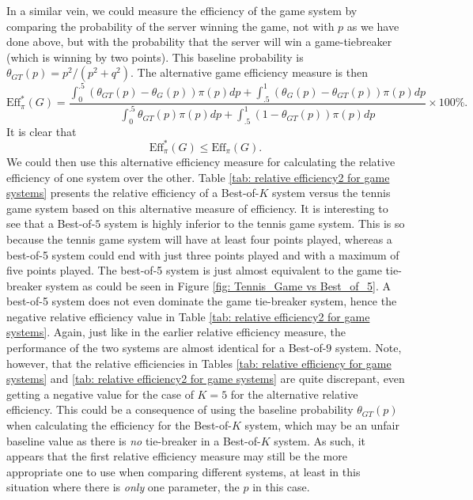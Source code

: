 \documentclass[11pt]{article}
\theoremstyle{plain}
\theoremstyle{definition}
\newcommand{\RED}[1]{{\color{red} #1}}
\begin{document}
{In a similar vein, we could measure the efficiency of the game system by comparing the probability of the server winning the game, not with $p$ as we have done above, but with the probability that the server will win a game-tiebreaker (which is winning by two points). This baseline probability is $\theta_{GT}(p) = p^2/(p^2 + q^2)$. The alternative game efficiency measure is then
%
$$\mbox{Eff}_\pi^*(G) = \frac{\int_0^{.5} (\theta_{GT}(p) - \theta_G(p)) \pi(p) dp + \int_{.5}^1 (\theta_G(p) - \theta_{GT}(p)) \pi(p) dp}{\int_0^{.5} \theta_{GT}(p) \pi(p) dp + \int_{.5}^1 (1 - \theta_{GT}(p)) \pi(p) dp} \times 100\%.$$
%
It is clear that
%
$$\mbox{Eff}_\pi^*(G) \le \mbox{Eff}_\pi(G).$$
%
We could then use this alternative efficiency measure for calculating the relative efficiency of one system over the other. Table \ref{tab: relative efficiency2 for game systems} presents the relative efficiency of a Best-of-$K$ system versus the tennis game system based on this alternative measure of efficiency. It is interesting to see that a Best-of-$5$ system is highly inferior to the tennis game system. This is so because the tennis game system will have at least four points played, whereas a best-of-5 system could end with just three points played and with a maximum of five points played. The best-of-5 system is just almost equivalent to the game tie-breaker system as could be seen in Figure \ref{fig: Tennis_Game vs Best_of_5}. A best-of-5 system does not even dominate the game tie-breaker system, hence the negative relative efficiency value in Table \ref{tab: relative efficiency2 for game systems}. Again, just like in the earlier relative efficiency measure, the performance of the two systems are almost identical for a Best-of-$9$ system.
\RED{Note, however, that the relative efficiencies in Tables \ref{tab: relative efficiency for game systems} and \ref{tab: relative efficiency2 for game systems} are quite discrepant, even getting a negative value for the case of $K=5$ for the alternative relative efficiency. This could be a consequence of using the baseline probability $\theta_{GT}(p)$ when calculating the efficiency for the Best-of-$K$ system, which may be an unfair baseline value as there is {\em no} tie-breaker in a Best-of-$K$ system. As such, it appears that the first relative efficiency measure may still be the more appropriate one to use when comparing different systems, at least in this situation where there is {\em only} one parameter, the $p$ in this case.}

}
\end{document}
